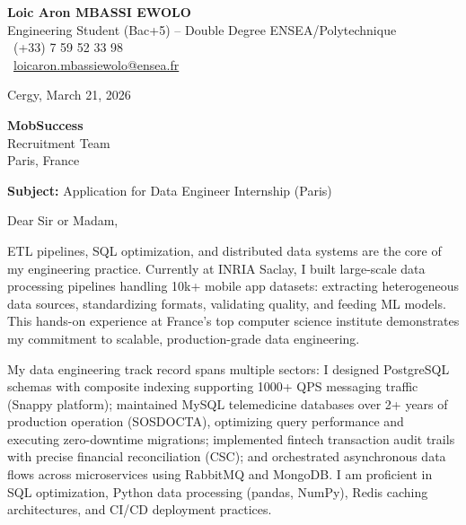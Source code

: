 \documentclass[a4paper,11pt]{article}
\begin{document}
\noindent
\begin{minipage}[t]{0.5\textwidth}
    \textbf{Loic Aron MBASSI EWOLO}\\
    Engineering Student (Bac+5) -- Double Degree ENSEA/Polytechnique\\[3pt]
    \Mobilefone\ (+33) 7 59 52 33 98\\
    \Letter\ \href{mailto:loicaron.mbassiewolo@ensea.fr}{loicaron.mbassiewolo@ensea.fr}
\end{minipage}
\hfill
\begin{minipage}[t]{0.4\textwidth}
    \raggedleft
    Cergy, March 21, 2026
\end{minipage}

\vspace{1.2cm}

\hfill
\begin{minipage}[t]{0.5\textwidth}
    \raggedleft
    \textbf{MobSuccess} \\
    Recruitment Team \\
    Paris, France
\end{minipage}

\vspace{1cm}

\noindent\textbf{Subject:} Application for Data Engineer Internship (Paris)

\vspace{0.8cm}

Dear Sir or Madam,

ETL pipelines, SQL optimization, and distributed data systems are the core of my engineering practice. Currently at INRIA Saclay, I built large-scale data processing pipelines handling 10k+ mobile app datasets: extracting heterogeneous data sources, standardizing formats, validating quality, and feeding ML models. This hands-on experience at France's top computer science institute demonstrates my commitment to scalable, production-grade data engineering.

My data engineering track record spans multiple sectors: I designed PostgreSQL schemas with composite indexing supporting 1000+ QPS messaging traffic (Snappy platform); maintained MySQL telemedicine databases over 2+ years of production operation (SOSDOCTA), optimizing query performance and executing zero-downtime migrations; implemented fintech transaction audit trails with precise financial reconciliation (CSC); and orchestrated asynchronous data flows across microservices using RabbitMQ and MongoDB. I am proficient in SQL optimization, Python data processing (pandas, NumPy), Redis caching architectures, and CI/CD deployment practices.
\end{document}
